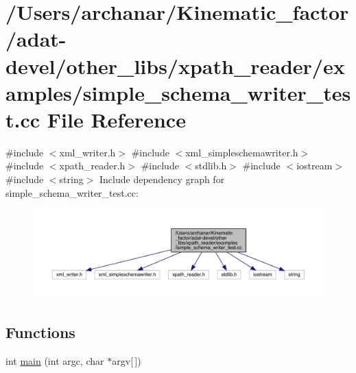 \hypertarget{adat-devel_2other__libs_2xpath__reader_2examples_2simple__schema__writer__test_8cc}{}\section{/\+Users/archanar/\+Kinematic\+\_\+factor/adat-\/devel/other\+\_\+libs/xpath\+\_\+reader/examples/simple\+\_\+schema\+\_\+writer\+\_\+test.cc File Reference}
\label{adat-devel_2other__libs_2xpath__reader_2examples_2simple__schema__writer__test_8cc}
{\ttfamily \#include $<$xml\+\_\+writer.\+h$>$}\newline
{\ttfamily \#include $<$xml\+\_\+simpleschemawriter.\+h$>$}\newline
{\ttfamily \#include $<$xpath\+\_\+reader.\+h$>$}\newline
{\ttfamily \#include $<$stdlib.\+h$>$}\newline
{\ttfamily \#include $<$iostream$>$}\newline
{\ttfamily \#include $<$string$>$}\newline
Include dependency graph for simple\+\_\+schema\+\_\+writer\+\_\+test.\+cc\+:
\nopagebreak
\begin{figure}[H]
\begin{center}
\leavevmode
\includegraphics[width=350pt]{d4/d71/adat-devel_2other__libs_2xpath__reader_2examples_2simple__schema__writer__test_8cc__incl}
\end{center}
\end{figure}
\subsection*{Functions}
\begin{DoxyCompactItemize}
\item 
int \mbox{\hyperlink{adat-devel_2other__libs_2xpath__reader_2examples_2simple__schema__writer__test_8cc_a0ddf1224851353fc92bfbff6f499fa97}{main}} (int argc, char $\ast$argv\mbox{[}$\,$\mbox{]})
\end{DoxyCompactItemize}


